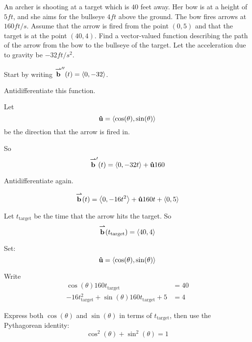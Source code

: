\documentclass{ximera}
\author{Gregory Hartman \and Bart Snapp}
\begin{document}
\begin{exercise}
  An archer is shooting at a target which is $40$ feet away. Her bow
  is at a height of $5\unit{ft}$, and she aims for the bullseye
  $4\unit{ft}$ above the ground. The bow fires arrows at $160
  \unit{ft/s}$. Assume that the arrow is fired from the point $(0,5)$
  and that the target is at the point $(40,4)$. Find a vector-valued
  function describing the path of the arrow from the bow to the
  bullseye of the target. Let the acceleration due to gravity be $-32
  \unit{ft}/\unit{s}^2$.
  \begin{hint}
    Start by writing ${\overset{\boldsymbol{\rightharpoonup}}{\mathbf{b}}}''(t) = \left\langle 0,-32\right\rangle$.
  \end{hint}
  \begin{hint}
    Antidifferentiate this function.
  \end{hint}
  \begin{hint}
    Let
    \[
    \mathbf{\hat{u}} = \left\langle \cos(\theta),\sin(\theta)\right\rangle
    \]
    be the direction that the arrow is fired in.
  \end{hint}
  \begin{hint}
    So
    \[
    {\overset{\boldsymbol{\rightharpoonup}}{\mathbf{b}}}'(t) = \left\langle 0,-32t\right\rangle + \mathbf{\hat{u}}160
    \]
  \end{hint}
  \begin{hint}
    Antidifferentiate again.
  \end{hint}
  \begin{hint}
    \[
    {\overset{\boldsymbol{\rightharpoonup}}{\mathbf{b}}}(t) = \left\langle 0,-16t^2\right\rangle + \mathbf{\hat{u}}160t + \left\langle 0,5\right\rangle
    \]
  \end{hint}
  \begin{hint}
    Let $t_{\text{target}}$ be the time that the arrow hits the
    target. So
    \[
    {\overset{\boldsymbol{\rightharpoonup}}{\mathbf{b}}}(t_{\text{target}}) =\left\langle 40,4\right\rangle
    \]
  \end{hint}
  \begin{hint}
    Set:
    \[
    \mathbf{\hat{u}} = \left\langle \cos(\theta),\sin(\theta)\right\rangle
    \]
  \end{hint}
  \begin{hint}
    Write
    \begin{align*}
      \cos(\theta) 160 t_{\text{target}} &= 40\\
      -16t_{\text{target}}^2 +\sin(\theta) 160 t_{\text{target}} +5 &=4
    \end{align*}
  \end{hint}
  \begin{hint}
    Express both $\cos(\theta)$ and $\sin(\theta)$ in terms
    of $t_{\text{target}}$, then use the Pythagorean identity:
    \[
    \cos^2(\theta) + \sin^2(\theta) = 1
\]
\end{hint}
\end{exercise}
\end{document}
